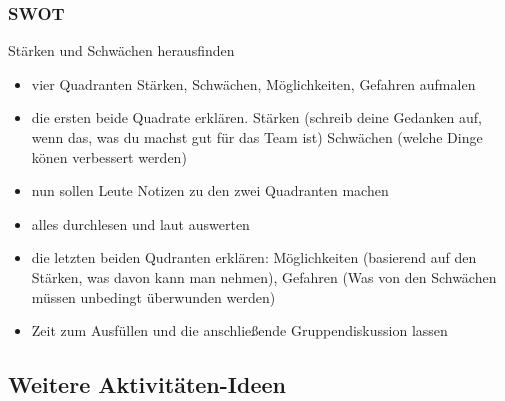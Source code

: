 \subsubsection{SWOT}
Stärken und Schwächen herausfinden
\begin{itemize}
  \item vier Quadranten Stärken, Schwächen, Möglichkeiten, Gefahren aufmalen
  \item die ersten beide Quadrate erklären. Stärken (schreib deine Gedanken auf, wenn das, was
    du machst gut für das Team ist) Schwächen (welche Dinge könen verbessert werden)
  \item nun sollen Leute Notizen zu den zwei Quadranten machen
  \item alles durchlesen und laut auswerten
  \item die letzten beiden Qudranten erklären: Möglichkeiten (basierend auf den
    Stärken, was davon kann man nehmen), Gefahren (Was von den Schwächen müssen
    unbedingt überwunden werden)
  \item Zeit zum Ausfüllen und die anschließende Gruppendiskussion lassen
\end{itemize}


\subsection{Weitere Aktivitäten-Ideen}
